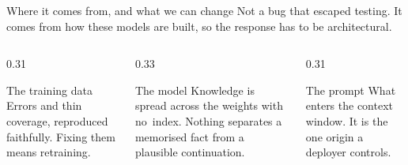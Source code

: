 \begin{frame}{Where it comes from, and what we can change}
  Not a bug that escaped testing. It comes from how these models are built,
  so the response has to be architectural.
  \vspace{3mm}
  \begin{columns}[T]
    \begin{column}{0.31\textwidth}
      \begin{block}{The training data}
        \agrraggedright
        Errors and thin coverage, reproduced faithfully. Fixing them means
        retraining.
      \end{block}
    \end{column}
    \begin{column}{0.33\textwidth}
      \begin{block}{The model}
        \agrraggedright
        Knowledge is spread across the weights with \mbox{\alert{no index}}.
        Nothing separates a memorised fact from a plausible continuation.
      \end{block}
    \end{column}
    \begin{column}{0.31\textwidth}
      \begin{block}{\alert{The prompt}}
        \agrraggedright
        What enters the context window. It is the one origin a deployer
        controls.
      \end{block}
    \end{column}
  \end{columns}
\end{frame}

